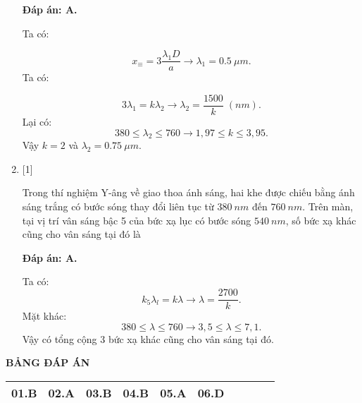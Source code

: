 \begin{enumerate}[label=\bfseries Câu \arabic*:]
\loigiai
{		\textbf{Đáp án: A.}
	
	Ta có:
	
	$$
	x_{\equiv} = 3 \dfrac{\lambda_{1} D}{a} \rightarrow \lambda_{1} = \SI{0,5}{\mu m}.
	$$
	Ta có:
	
	$$
	3 \lambda_{1} = k \lambda_{2} \rightarrow \lambda_{2} = \dfrac{1500}{k} \; (\si{nm}).
	$$
	Lại có:
	$$
	380 \leq \lambda_{2} \leq 760 \rightarrow 1,97 \leq k \leq 3,95.
	$$
	Vậy $k = 2$ và $\lambda_{2} = \SI{0,75}{\mu m}$.
}   
	
\item {} [1]

\cauhoi
{Trong thí nghiệm Y-âng về giao thoa ánh sáng, hai khe được chiếu bằng ánh sáng trắng có bước sóng thay đổi liên tục từ $\SI{380}{nm}$ đến $\SI{760}{nm}$. Trên màn, tại vị trí vân sáng bậc 5 của bức xạ lục có bước sóng $\SI{540}{nm}$, số bức xạ khác cũng cho vân sáng tại đó là
}

\loigiai
{		\textbf{Đáp án: A.}
	
	Ta có:
	$$
	k_{5}\lambda_{l} = k \lambda \rightarrow \lambda = \dfrac{2700}{k} .
	$$
	Mặt khác:
	$$
	380 \leq \lambda \leq 760 \rightarrow 3,5 \leq \lambda \leq 7,1.
	$$
	Vậy có tổng cộng 3 bức xạ khác cũng cho vân sáng tại đó.
}

	
\end{enumerate}

\loigiai
{
	\begin{center}
		\textbf{BẢNG ĐÁP ÁN}
	\end{center}
	\begin{center}
		\begin{tabular}{|m{2.8em}|m{2.8em}|m{2.8em}|m{2.8em}|m{2.8em}|m{2.8em}|m{2.8em}|m{2.8em}|m{2.8em}|m{2.8em}|}
			\hline
			01.B  & 02.A  & 03.B  & 04.B  & 05.A  & 06.D  & &  &  &  \\
			\hline
			
		\end{tabular}
	\end{center}
}

\whiteBGstarEnd